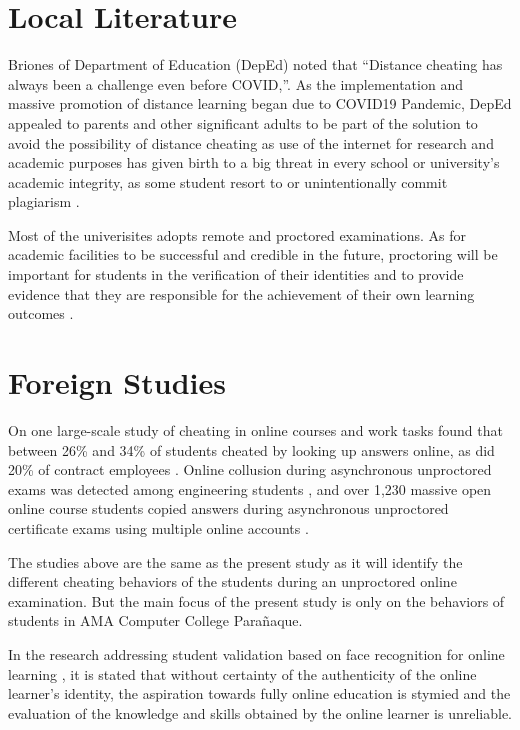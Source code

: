 \section{Local Literature}

Briones of Department of Education (DepEd) noted that “Distance cheating has always been a challenge even before COVID,”.
As the implementation and massive promotion of distance learning began due to COVID19 Pandemic, DepEd appealed to parents and other significant adults to be part of the solution to avoid the possibility of distance cheating as use of the internet for research and academic purposes has given birth to a big threat in every school or university's academic integrity, as some student resort to or unintentionally commit plagiarism \cite{quieta2020plagiarism}.

Most of the univerisites adopts remote and proctored examinations.
As for academic facilities to be successful and credible in the future, proctoring will be important for students in the verification of their identities and to provide evidence that they are responsible for the achievement of their own learning outcomes \cite{dela2015massive}.

\section{Foreign Studies}

On one large-scale study of cheating in online courses and work tasks found that between 26\% and 34\% of students cheated by looking up answers online, as did 20\% of contract employees \cite{corrigan2015deterring}.
Online collusion during asynchronous unproctored exams was detected among engineering students \cite{de2015calculated}, and over 1,230 massive open online course students copied answers during asynchronous unproctored certificate exams using multiple online accounts \cite{northcutt2016detecting}.

The studies above are the same as the present study as it will identify the different cheating behaviors of the students during an unproctored online examination.
But the main focus of the present study is only on the behaviors of students in AMA Computer College Parañaque.

In the research addressing student validation based on face recognition for online learning \cite{labayen2014smowl}, it is stated that without certainty of the authenticity of the online learner’s identity, the aspiration towards fully online education is stymied and the evaluation of the knowledge and skills obtained by the online learner is unreliable.

